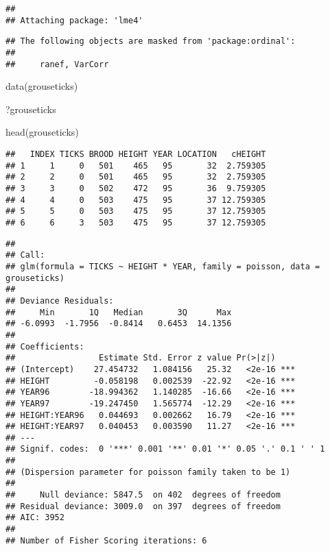 \documentclass[
]{article}
\newenvironment{Shaded}{\begin{snugshade}}{\end{snugshade}}
\newcommand{\AttributeTok}[1]{\textcolor[rgb]{0.77,0.63,0.00}{#1}}
\newcommand{\DecValTok}[1]{\textcolor[rgb]{0.00,0.00,0.81}{#1}}
\newcommand{\FunctionTok}[1]{\textcolor[rgb]{0.00,0.00,0.00}{#1}}
\newcommand{\NormalTok}[1]{#1}
\newcommand{\OtherTok}[1]{\textcolor[rgb]{0.56,0.35,0.01}{#1}}
\newcommand{\SpecialCharTok}[1]{\textcolor[rgb]{0.00,0.00,0.00}{#1}}
\begin{document}
\begin{verbatim}
## 
## Attaching package: 'lme4'
\end{verbatim}

\begin{verbatim}
## The following objects are masked from 'package:ordinal':
## 
##     ranef, VarCorr
\end{verbatim}

\begin{Shaded}
\begin{Highlighting}[]
\FunctionTok{data}\NormalTok{(grouseticks)}

\NormalTok{?grouseticks}

\FunctionTok{head}\NormalTok{(grouseticks)}
\end{Highlighting}
\end{Shaded}

\begin{verbatim}
##   INDEX TICKS BROOD HEIGHT YEAR LOCATION   cHEIGHT
## 1     1     0   501    465   95       32  2.759305
## 2     2     0   501    465   95       32  2.759305
## 3     3     0   502    472   95       36  9.759305
## 4     4     0   503    475   95       37 12.759305
## 5     5     0   503    475   95       37 12.759305
## 6     6     3   503    475   95       37 12.759305
\end{verbatim}

\begin{Shaded}
\end{Shaded}

\begin{verbatim}
## 
## Call:
## glm(formula = TICKS ~ HEIGHT * YEAR, family = poisson, data = grouseticks)
## 
## Deviance Residuals: 
##     Min       1Q   Median       3Q      Max  
## -6.0993  -1.7956  -0.8414   0.6453  14.1356  
## 
## Coefficients:
##                 Estimate Std. Error z value Pr(>|z|)    
## (Intercept)    27.454732   1.084156   25.32   <2e-16 ***
## HEIGHT         -0.058198   0.002539  -22.92   <2e-16 ***
## YEAR96        -18.994362   1.140285  -16.66   <2e-16 ***
## YEAR97        -19.247450   1.565774  -12.29   <2e-16 ***
## HEIGHT:YEAR96   0.044693   0.002662   16.79   <2e-16 ***
## HEIGHT:YEAR97   0.040453   0.003590   11.27   <2e-16 ***
## ---
## Signif. codes:  0 '***' 0.001 '**' 0.01 '*' 0.05 '.' 0.1 ' ' 1
## 
## (Dispersion parameter for poisson family taken to be 1)
## 
##     Null deviance: 5847.5  on 402  degrees of freedom
## Residual deviance: 3009.0  on 397  degrees of freedom
## AIC: 3952
## 
## Number of Fisher Scoring iterations: 6
\end{verbatim}
\end{document}
